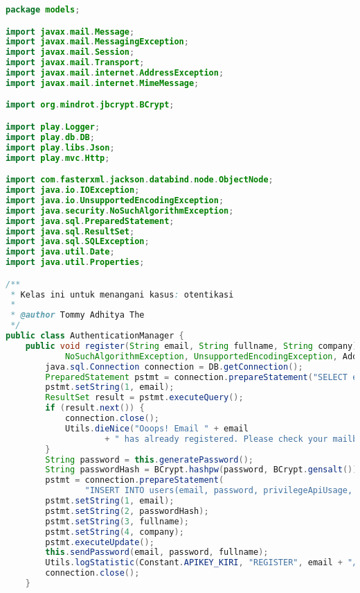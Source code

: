 \begin{lstlisting}[language=Java,basicstyle=\tiny,caption=models/AuthenticationManager.java,label={lst:authenticationmanager.java}]
package models;

import javax.mail.Message;
import javax.mail.MessagingException;
import javax.mail.Session;
import javax.mail.Transport;
import javax.mail.internet.AddressException;
import javax.mail.internet.MimeMessage;

import org.mindrot.jbcrypt.BCrypt;

import play.Logger;
import play.db.DB;
import play.libs.Json;
import play.mvc.Http;

import com.fasterxml.jackson.databind.node.ObjectNode;
import java.io.IOException;
import java.io.UnsupportedEncodingException;
import java.security.NoSuchAlgorithmException;
import java.sql.PreparedStatement;
import java.sql.ResultSet;
import java.sql.SQLException;
import java.util.Date;
import java.util.Properties;

/**
 * Kelas ini untuk menangani kasus: otentikasi
 * 
 * @author Tommy Adhitya The
 */
public class AuthenticationManager {
	public void register(String email, String fullname, String company) throws IOException, SQLException,
			NoSuchAlgorithmException, UnsupportedEncodingException, AddressException, MessagingException {
		java.sql.Connection connection = DB.getConnection();
		PreparedStatement pstmt = connection.prepareStatement("SELECT email FROM users WHERE email=?");
		pstmt.setString(1, email);
		ResultSet result = pstmt.executeQuery();
		if (result.next()) {
			connection.close();
			Utils.dieNice("Ooops! Email " + email
					+ " has already registered. Please check your mailbox or contact hello@kiri.travel");
		}
		String password = this.generatePassword();
		String passwordHash = BCrypt.hashpw(password, BCrypt.gensalt());
		pstmt = connection.prepareStatement(
				"INSERT INTO users(email, password, privilegeApiUsage, fullName, company) VALUES(? , ?, 1, ?, ?);");
		pstmt.setString(1, email);
		pstmt.setString(2, passwordHash);
		pstmt.setString(3, fullname);
		pstmt.setString(4, company);
		pstmt.executeUpdate();
		this.sendPassword(email, password, fullname);
		Utils.logStatistic(Constant.APIKEY_KIRI, "REGISTER", email + "/" + fullname + "" + company);
		connection.close();
	}


\end{lstlisting}
